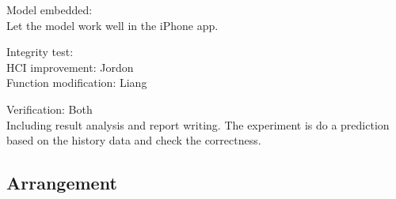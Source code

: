 \documentclass[12pt]{article}
\begin{document}
    Model embedded: \\
    Let the model work well in the iPhone app.

Integrity test: \\
    HCI improvement: Jordon \\ 
    Function modification:  Liang 

Verification: Both\\
    Including result analysis and report writing. The experiment is do
    a prediction based on the history data and check the correctness.

\subsection{Arrangement}
  \begin{gantt}{7}{8}
    \begin{ganttitle}
    \end{ganttitle}
  \end{gantt}




\end{document}
